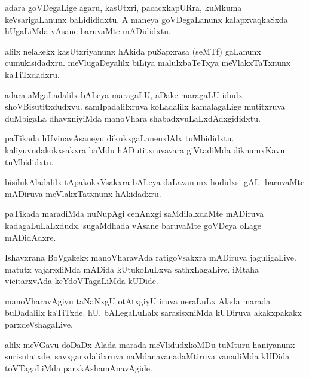 \documentclass{article}
\begin{document}
\begin{mn}
adara  goVDegaLige  agaru,  kasUtxri,  pacacxkapURra,  kuMkuma  keVsarigaLanunx  baLidididxtu.  A  maneya  
goVDegaLanunx  kalapxvaqkaSxda  hUgaLiMda  vAsane  baruvaMte  mADididxtu.
\end{mn}

\begin{mn}
alilx  nelakekx  kasUtxriyanunx  hAkida  puSapxrasa  (seMTf) gaLanunx  cumukisidadxru.  meVlugaDeyalilx  biLiya  
malulxbaTeTxya  meVlakxTaTxnunx  kaTiTxdadxru.
\end{mn}

\begin{mn}
adara  aMgaLadalilx  bALeya  maragaLU,  aDake  maragaLU  idudx  shoVBisutitxdudxvu.  samIpadalilxruva  koLadalilx  
kamalagaLige  mutitxruva  duMbigaLa  dhavxniyiMda  manoVhara  shabadxvuLaLxdAdxgididxtu.
\end{mn}

\begin{mn}
paTikada  hUvinavAsaneyu  dikukxgaLanenxlAlx  tuMbididxtu.  kaliyuvudakokxsakxra  baMdu  hADutitxruvavara  
giVtadiMda  diknumxKavu  tuMbididxtu.
\end{mn}

\begin{mn}
bisilukAladalilx  tApakokxVsakxra  bALeya  daLavanunx  hodidxsi  gALi  baruvaMte  mADiruva  meVlakxTatxnunx  hAkidadxru.
\end{mn}

\begin{mn}
paTikada  maradiMda  nuNupAgi  cenAnxgi  saMdilalxdaMte  mADiruva  kadagaLuLaLxdudx.  sugaMdhada  vAsane  baruvaMte  
goVDeya  oLage  mADidAdxre.
\end{mn}

\begin{mn}
Ishavxrana  BoVgakekx  manoVharavAda  ratigoVsakxra  mADiruva  jaguligaLive.  matutx  vajarxdiMda  mADida  kUtukoLuLxva  
sathxLagaLive.  iMtaha  vicitarxvAda  keYdoVTagaLiMda  kUDide.
\end{mn}

\begin{mn}
manoVharavAgiyu  taNaNxgU  otAtxgiyU  iruva  neraLuLx  Alada  marada  buDadalilx  kaTiTxde.  hU,  
bALegaLuLalx  sarasisxniMda  kUDiruva  akakxpakakx  parxdeVshagaLive.
\end{mn}

\begin{mn}
alilx  meVGavu  doDaDx  Alada  marada  meVlidudxkoMDu  tuMturu haniyanunx  surisutatxde.  
savxgarxdalilxruva  naMdanavanadaMtiruva  vanadiMda  kUDida  toVTagaLiMda  parxkAshamAnavAgide.
\end{mn}
\end{document}
